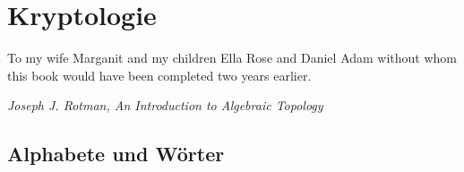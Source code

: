 \chapter{Kryptologie}\label{ch:Kryptologie}
\epigraph{To my wife Marganit and my children Ella Rose and Daniel Adam without whom this book would have been completed two years earlier.}
{\textit{Joseph J. Rotman, An Introduction to Algebraic Topology}}


\section{Alphabete und Wörter}

